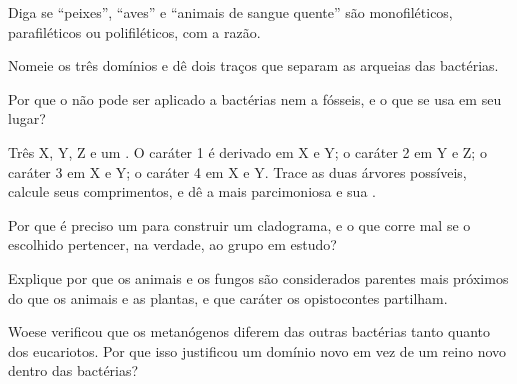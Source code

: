 \begin{exercise}[$\star$]\label{exo:b1:classifying-biodiversity:3}
Diga se ``peixes'', ``aves'' e ``animais de sangue quente'' são
monofiléticos, parafiléticos ou polifiléticos, com a razão.
\end{exercise}

\begin{exercise}[$\star$]\label{exo:b1:classifying-biodiversity:4}
Nomeie os três domínios e dê dois traços que separam as arqueias das
bactérias.
\end{exercise}

\begin{exercise}[$\star\star$]\label{exo:b1:classifying-biodiversity:5}
Por que o  não pode ser aplicado a
bactérias nem a fósseis, e o que se usa em seu lugar?
\end{exercise}

\begin{exercise}[$\star\star$]\label{exo:b1:classifying-biodiversity:6}
Três  X, Y, Z e um . O caráter 1 é derivado em X e
Y; o caráter 2 em Y e Z; o caráter 3 em X e Y; o caráter 4 em X e Y.
Trace as duas árvores possíveis, calcule seus comprimentos, e dê a
mais parcimoniosa e sua .
\end{exercise}

\begin{exercise}[$\star\star$]\label{exo:b1:classifying-biodiversity:7}
Por que é preciso um  para construir um cladograma, e o
que corre mal se o  escolhido pertencer, na verdade, ao
grupo em estudo?
\end{exercise}

\begin{exercise}[$\star\star$]\label{exo:b1:classifying-biodiversity:8}
Explique por que os animais e os fungos são considerados parentes mais
próximos do que os animais e as plantas, e que caráter os
opistocontes partilham.
\end{exercise}

\begin{exercise}[$\star\star$]\label{exo:b1:classifying-biodiversity:9}
Woese verificou que os metanógenos diferem das outras bactérias tanto
quanto dos eucariotos. Por que isso justificou um domínio novo em vez
de um reino novo dentro das bactérias?
\end{exercise}

